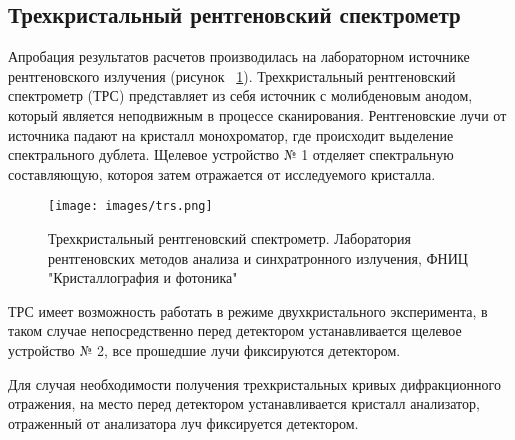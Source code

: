 \subsection{Трехкристальный рентгеновский спектрометр}
Апробация результатов расчетов производилась на лабораторном источнике
рентгеновского излучения (рисунок ~\ref{ris:trs}). Трехкристальный рентгеновский
спектрометр (ТРС) представляет из себя источник с молибденовым анодом, который является
неподвижным в процессе сканирования. Рентгеновские лучи от источника падают на
 кристалл монохроматор, где происходит выделение спектрального дублета. Щелевое
 устройство № 1 отделяет спектральную составляющую, котороя затем отражается от
 исследуемого кристалла.

\begin{figure}[H]
  \centering
  \texttt{[image: images/trs.png]}
  \caption{ Трехкристальный рентгеновский спектрометр. Лаборатория рентгеновских
  методов анализа и синхратронного излучения, ФНИЦ "Кристаллография и фотоника"}
  \label{ris:trs}
\end{figure}

ТРС имеет возможность работать в режиме двухкристального эксперимента,
в таком случае непосредственно перед детектором устанавливается щелевое устройство
№ 2, все прошедшие лучи фиксируются детектором.

Для случая необходимости получения трехкристальных кривых дифракционного отражения,
на место перед детектором устанавливается кристалл анализатор, отраженный от анализатора луч
фиксируется детектором.
